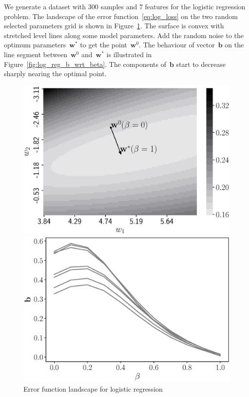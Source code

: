 \documentclass[
11pt,%
tightenlines,%
twoside,%
onecolumn,%
nofloats,%
nobibnotes,%
nofootinbib,%
superscriptaddress,%
noshowpacs,%
centertags]%
{revtex4}
\newcommand{\bb}{\mathbf{b}}
\newcommand{\bw}{\mathbf{w}}
\begin{document}
We generate a dataset with 300 samples and 7 features for the logistic regression problem. 
The landscape of the error function~\eqref{eq:log_loss} on the two random selected parameters grid is shown in Figure~\ref{fig:log_reg_error}.
The surface is convex with stretched level lines along some model parameters.
Add the random noise to the optimum parameters~$\bw^*$ to get the point~$\bw^0$. The behaviour of vector~$\bb$ on the line segment between~$\bw^0$ and~$\bw^*$ is illustrated in Figure~\ref{fig:log_reg_b_wrt_beta}.
The components of~$\bb$ start to decrease sharply nearing the optimal point.
\begin{figure}
	\centering
	\begin{minipage}{.5\textwidth}
		\setcaptionmargin{5mm}
		\onelinecaptionsfalse %
		\centering
		\includegraphics[width=\linewidth]{figs/gray_log_reg_error}
		\caption{Error function landscape for logistic regression}
		\label{fig:log_reg_error}
	\end{minipage}%
	\begin{minipage}{.5\textwidth}
		\setcaptionmargin{5mm}
		\onelinecaptionsfalse %
		\centering
		\includegraphics[width=\linewidth]{figs/gray_log_reg_b_wrt_beta.eps}

\end{minipage}
\end{figure}
\end{document}
